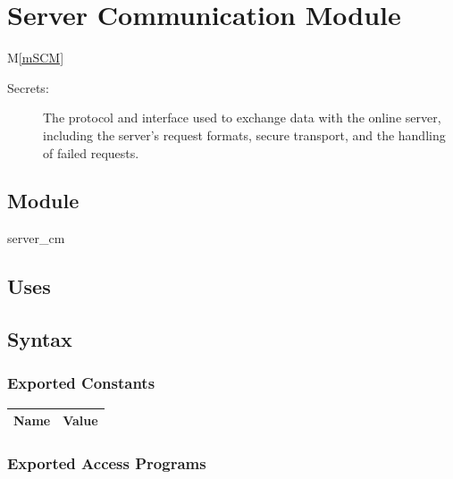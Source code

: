\documentclass[12pt, titlepage]{article}
\newcommand{\mref}[1]{M\ref{#1}}
\begin{document}
\newpage

\section{Server Communication Module} \mref{mSCM} 


\begin{description}
\item[Secrets:] The protocol and interface used to exchange data with the online server, including the server's request formats, secure transport, and the handling of failed requests.
\end{description}

\subsection{Module}

server\_cm

\subsection{Uses}


\subsection{Syntax}

\subsubsection{Exported Constants}

\begin{center}
\begin{tabular}{p{10cm} p{4cm}}
\hline
\textbf{Name} & \textbf{Value}\\
\hline

\hline
\end{tabular}
\end{center}

\subsubsection{Exported Access Programs}
\end{document}
